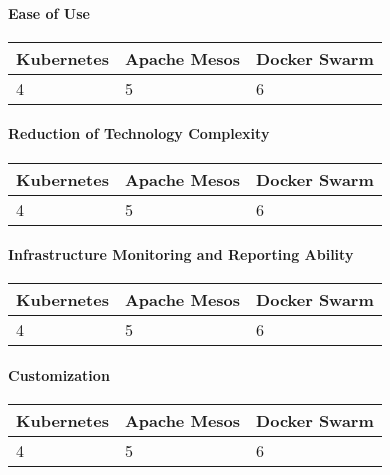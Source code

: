 \paragraph{Ease of Use}

\begin{center}
  \begin{tabular}{ | p{4.5cm} | p{4.5cm} | p{4.5cm} | }
    \hline
    \textbf{Kubernetes}&\textbf{Apache Mesos}&\textbf{Docker Swarm}\\\hline
    4 & 5 & 6 \\
    \hline
  \end{tabular}
\end{center}

\paragraph{Reduction of Technology Complexity}

\begin{center}
  \begin{tabular}{ | p{4.5cm} | p{4.5cm} | p{4.5cm} | }
    \hline
    \textbf{Kubernetes}&\textbf{Apache Mesos}&\textbf{Docker Swarm}\\\hline
    4 & 5 & 6 \\
    \hline
  \end{tabular}
\end{center}

\paragraph{Infrastructure Monitoring and Reporting Ability}

\begin{center}
  \begin{tabular}{ | p{4.5cm} | p{4.5cm} | p{4.5cm} | }
    \hline
    \textbf{Kubernetes}&\textbf{Apache Mesos}&\textbf{Docker Swarm}\\\hline
    4 & 5 & 6 \\
    \hline
  \end{tabular}
\end{center}

\paragraph{Customization}

\begin{center}
  \begin{tabular}{ | p{4.5cm} | p{4.5cm} | p{4.5cm} | }
    \hline
    \textbf{Kubernetes}&\textbf{Apache Mesos}&\textbf{Docker Swarm}\\\hline
    4 & 5 & 6 \\
    \hline
  \end{tabular}
\end{center}

